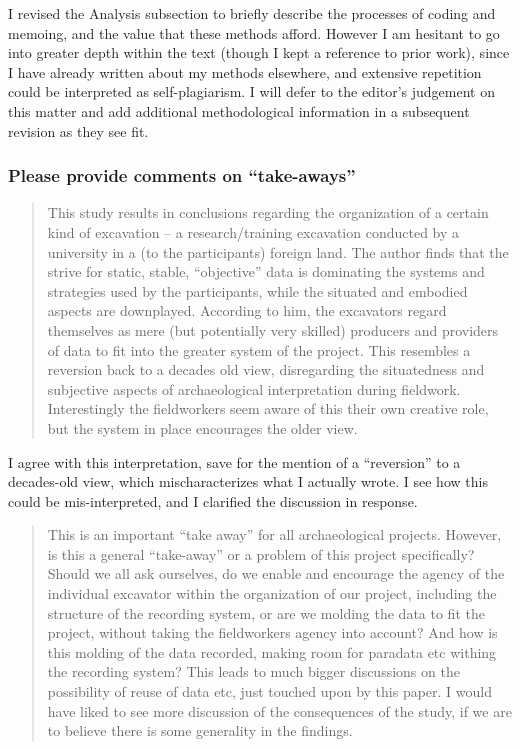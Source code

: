\documentclass[
]{article}
\begin{document}
I revised the Analysis subsection to briefly describe the processes of
coding and memoing, and the value that these methods afford. However I
am hesitant to go into greater depth within the text (though I kept a
reference to prior work), since I have already written about my methods
elsewhere, and extensive repetition could be interpreted as
self-plagiarism. I will defer to the editor's judgement on this matter
and add additional methodological information in a subsequent revision
as they see fit.

\subsubsection{Please provide comments on
``take-aways''}\label{please-provide-comments-on-take-aways}

\begin{quote}
This study results in conclusions regarding the organization of a
certain kind of excavation -- a research/training excavation conducted
by a university in a (to the participants) foreign land. The author
finds that the strive for static, stable, ``objective'' data is
dominating the systems and strategies used by the participants, while
the situated and embodied aspects are downplayed. According to him, the
excavators regard themselves as mere (but potentially very skilled)
producers and providers of data to fit into the greater system of the
project. This resembles a reversion back to a decades old view,
disregarding the situatedness and subjective aspects of archaeological
interpretation during fieldwork. Interestingly the fieldworkers seem
aware of this their own creative role, but the system in place
encourages the older view.
\end{quote}

I agree with this interpretation, save for the mention of a
``reversion'' to a decades-old view, which mischaracterizes what I
actually wrote. I see how this could be mis-interpreted, and I clarified
the discussion in response.

\begin{quote}
This is an important ``take away'' for all archaeological projects.
However, is this a general ``take-away'' or a problem of this project
specifically? Should we all ask ourselves, do we enable and encourage
the agency of the individual excavator within the organization of our
project, including the structure of the recording system, or are we
molding the data to fit the project, without taking the fieldworkers
agency into account? And how is this molding of the data recorded,
making room for paradata etc withing the recording system? This leads to
much bigger discussions on the possibility of reuse of data etc, just
touched upon by this paper. I would have liked to see more discussion of
the consequences of the study, if we are to believe there is some
generality in the findings.
\end{quote}
\end{document}
